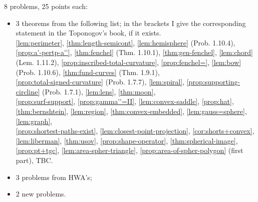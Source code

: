  8 problems, 25 points each:
\begin{itemize}
\item 3 theorems from the following list; in the brackets I give the corresponding statement in the Toponogov's book, if it exists.\\
\ref{lem:perimeter},
\ref{thm:length-semicont},
\ref{lem:hemisphere} (Prob. 1.10.4),\\
\ref{prop:a'-pertp-a''},
\ref{thm:fenchel} (Thm. 1.10.1),
\ref{thm:gen-fenchel},
\ref{lem:chord} (Lem. 1.11.2),
\ref{prop:inscribed-total-curvature},
\ref{prop:fenchel=},
\ref{lem:bow} (Prob. 1.10.6),
\ref{thm:fund-curves} (Thm. 1.9.1),
\\
\ref{prop:total-signed-curvature} (Prob. 1.7.7),
\ref{lem:spiral},
\ref{prop:supporting-circline} (Prob. 1.7.1),
\ref{lem:lens},
\ref{thm:moon},
\\
\ref{prop:surf-support},
\ref{prop:gamma''=II},
\ref{lem:convex-saddle},
\ref{prop:hat},
\ref{thm:bernshtein},
\ref{lem:region},
\ref{thm:convex-embedded},
\ref{lem:gauss=sphere},
\ref{lem:graph},
\\
\ref{prop:shortest-paths-exist},
\ref{lem:closest-point-projection},
\ref{cor:shorts+convex},
\ref{lem:liberman},
\ref{thm:usov},
\ref{prop:shape-operator},
\ref{thm:spherical-image},
\\
\ref{prop:pt+tgc},
\ref{lem:area-spher-triangle}, 
\ref{prop:area-of-spher-polygon} (first part),
TBC. %
\item 3 problems from HWA's;
\item 2 new problems.
\end{itemize}
